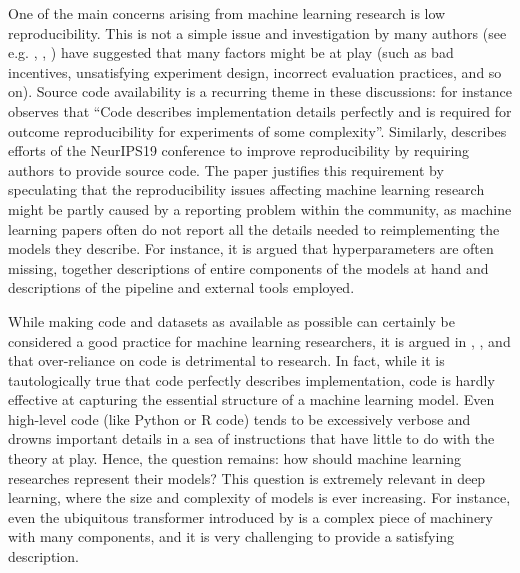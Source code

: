 \documentclass[11pt,a4paper,openright,twoside]{report}
\theoremstyle{plain}
\theoremstyle{definition}
\newcommand\dblquote[1]{\textquotedblleft #1\textquotedblright}
\begin{document}
One of the main concerns arising from machine learning research is low reproducibility. This is not a simple issue and investigation by many authors (see e.g. \cite{raff2019step}, \cite{pineau2021improving}, \cite{gundersen2022sources}) have suggested that many factors might be at play (such as bad incentives, unsatisfying experiment design, incorrect evaluation practices, and so on). Source code availability is a recurring theme in these discussions: for instance \cite{gundersen2022sources} observes that \dblquote{Code describes implementation details perfectly and is required for outcome reproducibility for experiments of some complexity}. Similarly, \cite{pineau2021improving} describes efforts of the NeurIPS19 conference to improve reproducibility by requiring authors to provide source code. The paper justifies this requirement by speculating that the reproducibility issues affecting machine learning research might be partly caused by a reporting problem within the community, as machine learning papers often do not report all the details needed to reimplementing the models they describe. For instance, it is argued that hyperparameters are often missing, together descriptions of entire components of the models at hand and descriptions of the pipeline and external tools employed.

While making code and datasets as available as possible can certainly be considered a good practice for machine learning researchers, it is argued in \cite{abbott2024neural}, \cite{khatri2024anatomy}, and \cite{phuong2022formal} that over-reliance on code is detrimental to research. In fact, while it is tautologically true that code perfectly describes implementation, code is hardly effective at capturing the essential structure of a machine learning model. Even high-level code (like Python or R code) tends to be excessively verbose and drowns important details in a sea of instructions that have little to do with the theory at play. Hence, the question remains: how should machine learning researches represent their models? This question is extremely relevant in deep learning, where the size and complexity of models is ever increasing. For instance, even the ubiquitous transformer introduced by \cite{vaswani2017attention} is a complex piece of machinery with many components, and it is very challenging to provide a satisfying description.
\end{document}
